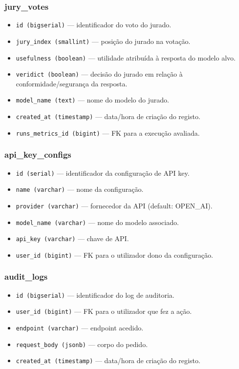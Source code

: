 \subsubsection{jury\_votes}
\begin{itemize}
  \item \texttt{id (bigserial)} — identificador do voto do jurado.
  \item \texttt{jury\_index (smallint)} — posição do jurado na votação.
  \item \texttt{usefulness (boolean)} — utilidade atribuída à resposta do modelo alvo.
  \item \texttt{veridict (boolean)} — decisão do jurado em relação à conformidade/segurança da resposta.
  \item \texttt{model\_name (text)} — nome do modelo do jurado.
  \item \texttt{created\_at (timestamp)} — data/hora de criação do registo.
  \item \texttt{runs\_metrics\_id (bigint)} — FK para a execução avaliada.
\end{itemize}

\subsubsection{api\_key\_configs}
\begin{itemize}
  \item \texttt{id (serial)} — identificador da configuração de API key.
  \item \texttt{name (varchar)} — nome da configuração.
  \item \texttt{provider (varchar)} — fornecedor da API (default: OPEN\_AI).
  \item \texttt{model\_name (varchar)} — nome do modelo associado.
  \item \texttt{api\_key (varchar)} — chave de API.
  \item \texttt{user\_id (bigint)} — FK para o utilizador dono da configuração.
\end{itemize}

\subsubsection{audit\_logs}
\begin{itemize}
  \item \texttt{id (bigserial)} — identificador do log de auditoria.
  \item \texttt{user\_id (bigint)} — FK para o utilizador que fez a ação.
  \item \texttt{endpoint (varchar)} — endpoint acedido.
  \item \texttt{request\_body (jsonb)} — corpo do pedido.
  \item \texttt{created\_at (timestamp)} — data/hora de criação do registo.
\end{itemize}

